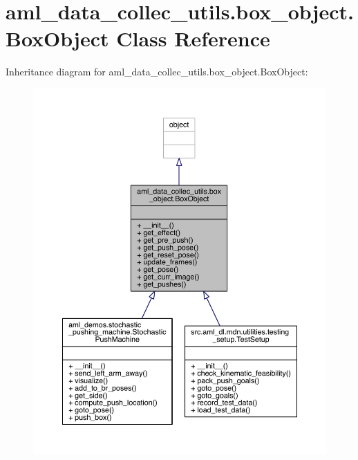 \hypertarget{classaml__data__collec__utils_1_1box__object_1_1_box_object}{}\section{aml\+\_\+data\+\_\+collec\+\_\+utils.\+box\+\_\+object.\+Box\+Object Class Reference}
\label{classaml__data__collec__utils_1_1box__object_1_1_box_object}


Inheritance diagram for aml\+\_\+data\+\_\+collec\+\_\+utils.\+box\+\_\+object.\+Box\+Object\+:
\nopagebreak
\begin{figure}[H]
\begin{center}
\leavevmode
\includegraphics[width=350pt]{classaml__data__collec__utils_1_1box__object_1_1_box_object__inherit__graph}
\end{center}
\end{figure}


